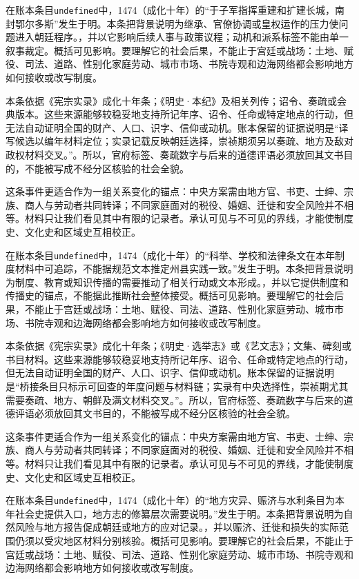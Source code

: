 在账本条目\texttt{undefined}中，1474（成化十年）的“于子军指挥重建和扩建长城，南封鄂尔多斯”发生于明。本条把背景说明为继承、官僚协调或皇权运作的压力使问题进入朝廷程序。，并以它影响后续人事与政策议程；动机和派系标签不能由单一叙事裁定。概括可见影响。要理解它的社会后果，不能止于宫廷或战场：土地、赋役、司法、道路、性别化家庭劳动、城市市场、书院寺观和边海网络都会影响地方如何接收或改写制度。

本条依据《宪宗实录》成化十年条；《明史·本纪》及相关列传；诏令、奏疏或会典版本。这些来源能够较稳妥地支持所记年序、诏令、任命或特定地点的行动，但无法自动证明全国的财产、人口、识字、信仰或动机。账本保留的证据说明是“译写候选以编年材料定位；实录记载反映朝廷选择，崇祯期须另以奏疏、地方及敌对政权材料交叉。”。所以，官府标签、奏疏数字与后来的道德评语必须放回其文书目的，不能被写成不经分区核验的社会全貌。

这条事件更适合作为一组关系变化的锚点：中央方案需由地方官、书吏、士绅、宗族、商人与劳动者共同转译；不同家庭面对的税役、婚姻、迁徙和安全风险并不相等。材料只让我们看见其中有限的记录者。承认可见与不可见的界线，才能使制度史、文化史和区域史互相校正。

在账本条目\texttt{undefined}中，1474（成化十年）的“科举、学校和法律条文在本年制度材料中可追踪，不能据规范文本推定州县实践一致。”发生于明。本条把背景说明为制度、教育或知识传播的需要推动了相关行动或文本形成。，并以它提供制度和传播史的锚点，不能据此推断社会整体接受。概括可见影响。要理解它的社会后果，不能止于宫廷或战场：土地、赋役、司法、道路、性别化家庭劳动、城市市场、书院寺观和边海网络都会影响地方如何接收或改写制度。

本条依据《宪宗实录》成化十年条；《明史·选举志》或《艺文志》；文集、碑刻或书目材料。这些来源能够较稳妥地支持所记年序、诏令、任命或特定地点的行动，但无法自动证明全国的财产、人口、识字、信仰或动机。账本保留的证据说明是“桥接条目只标示可回查的年度问题与材料链；实录有中央选择性，崇祯期尤其需要奏疏、地方、朝鲜及满文材料交叉。”。所以，官府标签、奏疏数字与后来的道德评语必须放回其文书目的，不能被写成不经分区核验的社会全貌。

这条事件更适合作为一组关系变化的锚点：中央方案需由地方官、书吏、士绅、宗族、商人与劳动者共同转译；不同家庭面对的税役、婚姻、迁徙和安全风险并不相等。材料只让我们看见其中有限的记录者。承认可见与不可见的界线，才能使制度史、文化史和区域史互相校正。

在账本条目\texttt{undefined}中，1474（成化十年）的“地方灾异、赈济与水利条目为本年社会史提供入口，地方志的修纂层次需要说明。”发生于明。本条把背景说明为自然风险与地方报告促成朝廷或地方的应对记录。，并以赈济、迁徙和损失的实际范围仍须以受灾地区材料分别核验。概括可见影响。要理解它的社会后果，不能止于宫廷或战场：土地、赋役、司法、道路、性别化家庭劳动、城市市场、书院寺观和边海网络都会影响地方如何接收或改写制度。


